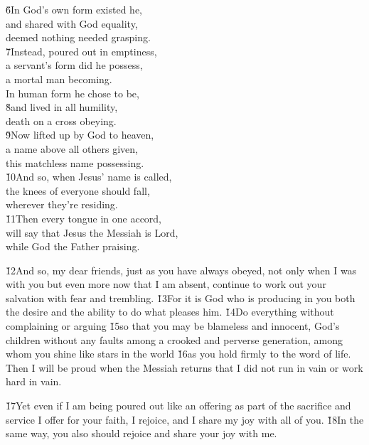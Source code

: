 \begin{poetry}
\poeml \v{6}In God's own form existed he, \\
\poemll    and shared with God equality, \\
\poemlll       deemed nothing needed grasping. \\
\poeml \v{7}Instead, poured out in emptiness, \\
\poemll    a servant's form did he possess, \\
\poemlll       a mortal man becoming. \\
\poeml In human form he chose to be, \\
\poeml \v{8}and lived in all humility, \\
\poemlll       death on a cross obeying. \\
\poeml \v{9}Now lifted up by God to heaven, \\
\poemll    a name above all others given, \\
\poemlll       this matchless name possessing. \\
\poeml \v{10}And so, when Jesus' name is called, \\
\poemll    the knees of everyone should fall, \\
\poemlll       wherever they're residing. \\
\poeml \v{11}Then every tongue in one accord, \\
\poemll    will say that Jesus the Messiah is Lord, \\
\poemlll       while God the Father praising.
\end{poetry}

\v{12}And so, my dear friends, just as you have always obeyed, not only when I was with you but even more now that I am absent, continue to work out your salvation with fear and trembling. \v{13}For it is God who is producing in you both the desire and the ability to do what pleases him. \v{14}Do everything without complaining or arguing \v{15}so that you may be blameless and innocent, God's children without any faults among a crooked and perverse generation, among whom you shine like stars in the world \v{16}as you hold firmly to the word of life. Then I will be proud when the Messiah returns that I did not run in vain or work hard in vain.

\v{17}Yet even if I am being poured out like an offering as part of the sacrifice and service I offer for your faith, I rejoice, and I share my joy with all of you. \v{18}In the same way, you also should rejoice and share your joy with me.

